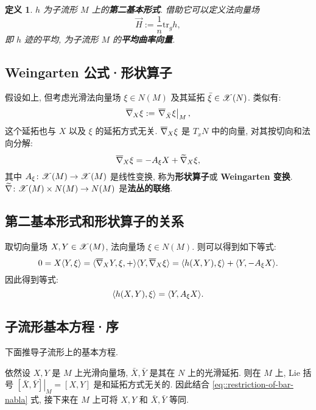 \documentclass{ctexart}
\newtheorem{definition}[theorem]{定义}
\begin{document}
\begin{definition}
	$h$ 为子流形 $M$ 上的{\bf 第二基本形式}. 借助它可以定义法向量场
	\begin{equation}\label{eq::mean-curvature-vector-def}
		\overrightarrow{H} := \dfrac{1}{n}\mathrm{tr}_{g}h,
	\end{equation}
	即 $h$ 迹的平均, 为子流形 $M$ 的{\bf 平均曲率向量}.
\end{definition}

\subsection{Weingarten 公式·形状算子}
假设如上, 但考虑光滑法向量场 $\xi \in N(M)$ 及其延拓 $\bar{\xi} \in \mathscr{X}(N)$. 类似有:
\begin{equation*}
	\overline{\nabla}_{X}{\xi} := \left.\overline{\nabla}_{\bar{X}}{\xi}\right|_{M},
\end{equation*}
这个延拓也与 $X$ 以及 $\xi$ 的延拓方式无关. $\overline{\nabla}_{X}{\xi}$ 是 $T_xN$ 中的向量, 对其按切向和法向分解:
\begin{equation}\label{eq::Weingarten-formula}
	\overline{\nabla}_{X}{\xi} = -A_{\xi}X + \widetilde{\nabla}_{X}{\xi},
\end{equation}
其中 $A_{\xi} \colon \mathscr{X}(M) \rightarrow \mathscr{X}(M)$ 是线性变换, 称为{\bf 形状算子}或 {\bf Weingarten 变换}. $\widetilde{\nabla} \colon \mathscr{X}(M) \times N(M) \rightarrow N(M)$ 是{\bf 法丛的联络}.

\subsection{第二基本形式和形状算子的关系}
取切向量场 $X, Y \in \mathscr{X}(M)$, 法向量场 $\xi \in N(M)$. 则可以得到如下等式:
\begin{equation*}
	0 = X\langle {Y}, {\xi} \rangle = \langle {\overline{\nabla}_{X}{Y}, \xi}, {+} \rangle \langle {Y}, {\overline{\nabla}_{X}{\xi}} \rangle = \langle {h(X, Y)}, {\xi} \rangle + \langle {Y}, {-A_{\xi}X} \rangle.
\end{equation*}
因此得到等式:
\begin{equation}
	\langle {h(X, Y)}, {\xi} \rangle = \langle {Y}, {A_{\xi}{X}} \rangle.
\end{equation}

\subsection{子流形基本方程·序}
下面推导子流形上的基本方程.

依然设 $X, Y$ 是 $M$ 上光滑向量场, $\bar{X}, \bar{Y}$ 是其在 $N$ 上的光滑延拓. 则在 $M$ 上, Lie 括号 $\left.[\bar{X}, \bar{Y}]\right|_{M} = [X, Y]$ 是和延拓方式无关的. 因此结合 \ref{eq::restriction-of-bar-nabla} 式, 接下来在 $M$ 上可将 $X, Y$ 和 $\bar{X}, \bar{Y}$ 等同.
\end{document}

